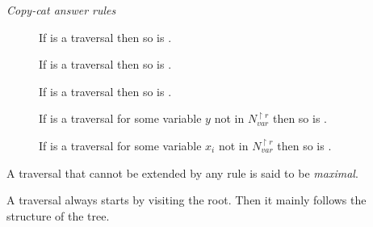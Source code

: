 \begin{definition}
\noindent \emph{Copy-cat answer rules}
\begin{description}
\item[]
  If 
is a traversal then so is .

\item[] If 
is a traversal then so is .

\item[] If 
is a traversal then so is .

\item[] If  is a
traversal for some variable $y$ not in $N_{var}^{\upharpoonright
r}$ then so is .

\end{description}

\begin{description}
\item[]
If  is a traversal for some variable
    $x_i$ not in $N_{var}^{\upharpoonright r}$ then
so is .
\end{description}
A traversal that cannot be extended by any rule is said to be \emph{maximal}.
\end{definition}


A traversal always starts by visiting the root. Then it mainly
follows the structure of the tree.

